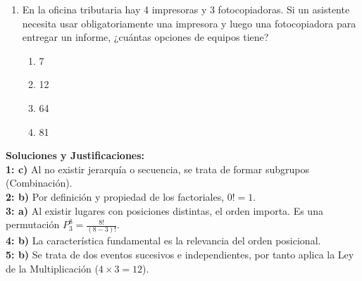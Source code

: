 \documentclass[12pt,letterpaper]{book}
\begin{document}
\begin{enumerate}[label=\textbf{Pregunta \arabic*:}]
    \item En la oficina tributaria hay 4 impresoras y 3 fotocopiadoras. Si un asistente necesita usar obligatoriamente una impresora y luego una fotocopiadora para entregar un informe, ¿cuántas opciones de equipos tiene?
    \begin{enumerate}[label=\alph*)]
        \item 7
        \item 12
        \item 64
        \item 81
    \end{enumerate}
\end{enumerate}

\vspace{1cm}
\begin{formulaclave}
\textbf{Soluciones y Justificaciones:} \\
\textbf{1: c)} Al no existir jerarquía o secuencia, se trata de formar subgrupos (Combinación). \\
\textbf{2: b)} Por definición y propiedad de los factoriales, $0! = 1$. \\
\textbf{3: a)} Al existir lugares con posiciones distintas, el orden importa. Es una permutación $P_{3}^{8} = \frac{8!}{(8-3)!}$. \\
\textbf{4: b)} La característica fundamental es la relevancia del orden posicional. \\
\textbf{5: b)} Se trata de dos eventos sucesivos e independientes, por tanto aplica la Ley de la Multiplicación ($4 \times 3 = 12$).
\end{formulaclave}

\backmatter
\end{document}

